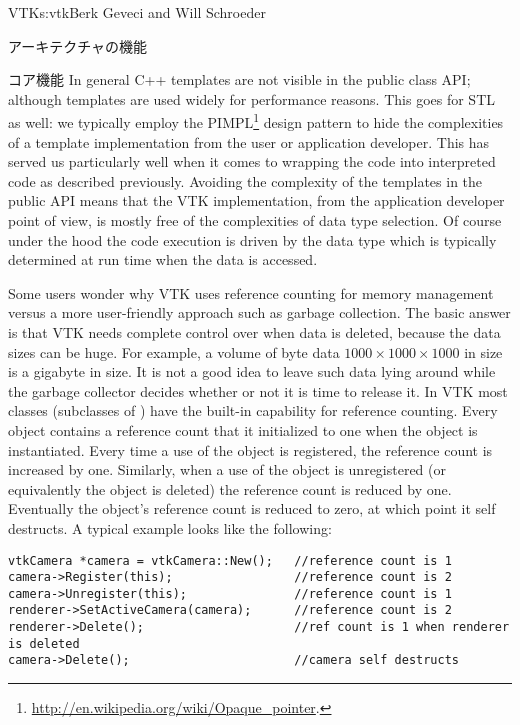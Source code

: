 \begin{aosachapter}{VTK}{s:vtk}{Berk Geveci and Will Schroeder}
\begin{aosasect1}{アーキテクチャの機能}
\begin{aosasect2}{コア機能}
In general C++ templates are not visible in the public class API;
although templates are used widely for performance reasons. This goes
for STL as well: we typically employ the
PIMPL\footnote{\url{http://en.wikipedia.org/wiki/Opaque\_pointer}.}
design pattern to hide the complexities of a template implementation
from the user or application developer. This has served us
particularly well when it comes to wrapping the code into interpreted
code as described previously. Avoiding the complexity of the templates
in the public API means that the VTK implementation, from the
application developer point of view, is mostly free of the
complexities of data type selection. Of course under the hood the code
execution is driven by the data type which is typically determined at
run time when the data is accessed.

Some users wonder why VTK uses reference counting for memory
management versus a more user-friendly approach such as garbage
collection. The basic answer is that VTK needs complete control over
when data is deleted, because the data sizes can be huge. For example,
a volume of byte data $1000{\times}1000{\times}1000$ in size is a
gigabyte in size. It is not a good idea to leave such data lying
around while the garbage collector decides whether or not it is time
to release it. In VTK most classes (subclasses of )
have the built-in capability for reference counting. Every object
contains a reference count that it initialized to one when the object
is instantiated.  Every time a use of the object is registered, the
reference count is increased by one. Similarly, when a use of the
object is unregistered (or equivalently the object is deleted) the
reference count is reduced by one. Eventually the object's reference
count is reduced to zero, at which point it self destructs.  A typical
example looks like the following:

\begin{verbatim}
vtkCamera *camera = vtkCamera::New();   //reference count is 1
camera->Register(this);                 //reference count is 2
camera->Unregister(this);               //reference count is 1
renderer->SetActiveCamera(camera);      //reference count is 2
renderer->Delete();                     //ref count is 1 when renderer is deleted
camera->Delete();                       //camera self destructs
\end{verbatim}


\end{aosasect2}
\end{aosasect1}
\end{aosachapter}
